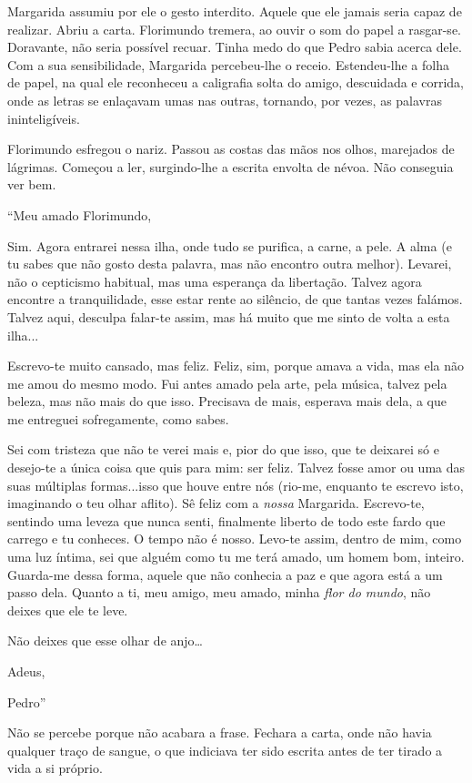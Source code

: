 Margarida assumiu por ele o gesto interdito. Aquele que ele jamais seria
capaz de realizar. Abriu a carta. Florimundo tremera, ao ouvir o som do
papel a rasgar-se. Doravante, não seria possível recuar. Tinha medo do
que Pedro sabia acerca dele. Com a sua sensibilidade, Margarida
percebeu-lhe o receio. Estendeu-lhe a folha de papel, na qual ele
reconheceu a caligrafia solta do amigo, descuidada e corrida, onde as
letras se enlaçavam umas nas outras, tornando, por vezes, as palavras
ininteligíveis.

Florimundo esfregou o nariz. Passou as costas das mãos nos olhos,
marejados de lágrimas. Começou a ler, surgindo-lhe a escrita envolta de
névoa. Não conseguia ver bem.

``Meu amado Florimundo,

Sim. Agora entrarei nessa ilha, onde tudo se purifica, a carne, a pele.
A alma (e tu sabes que não gosto desta palavra, mas não encontro outra
melhor). Levarei, não o cepticismo habitual, mas uma esperança da
libertação. Talvez agora encontre a tranquilidade, esse estar rente ao
silêncio, de que tantas vezes falámos. Talvez aqui, desculpa falar-te
assim, mas há muito que me sinto de volta a esta ilha...

Escrevo-te muito cansado, mas feliz. Feliz, sim, porque amava a vida,
mas ela não me amou do mesmo modo. Fui antes amado pela arte, pela
música, talvez pela beleza, mas não mais do que isso. Precisava de mais,
esperava mais dela, a que me entreguei sofregamente, como sabes.

Sei com tristeza que não te verei mais e, pior do que isso, que te
deixarei só e desejo-te a única coisa que quis para mim: ser feliz.
Talvez fosse amor ou uma das suas múltiplas formas...isso que houve
entre nós (rio-me, enquanto te escrevo isto, imaginando o teu olhar
aflito). Sê feliz com a \emph{nossa} Margarida. Escrevo-te, sentindo uma
leveza que nunca senti, finalmente liberto de todo este fardo que
carrego e tu conheces. O tempo não é nosso. Levo-te assim, dentro de
mim, como uma luz íntima, sei que alguém como tu me terá amado, um homem
bom, inteiro. Guarda-me dessa forma, aquele que não conhecia a paz e que
agora está a um passo dela. Quanto a ti, meu amigo, meu amado, minha
\emph{flor do mundo}, não deixes que ele te leve.

Não deixes que esse olhar de anjo\ldots{}

Adeus,

Pedro''

Não se percebe porque não acabara a frase. Fechara a carta, onde não
havia qualquer traço de sangue, o que indiciava ter sido escrita antes
de ter tirado a vida a si próprio.

